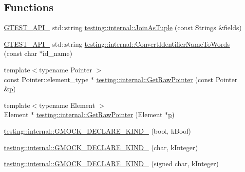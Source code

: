 \subsection*{Functions}
\begin{DoxyCompactItemize}
\item 
\mbox{\hyperlink{_obj__test_2lib_2googletest-release-1_88_81_2googletest_2include_2gtest_2internal_2gtest-port_8h_aa73be6f0ba4a7456180a94904ce17790}{G\+T\+E\+S\+T\+\_\+\+A\+P\+I\+\_\+}} std\+::string \mbox{\hyperlink{namespacetesting_1_1internal_a4ffe5309bf49f08145ed010a6d244e41}{testing\+::internal\+::\+Join\+As\+Tuple}} (const Strings \&fields)
\item 
\mbox{\hyperlink{_obj__test_2lib_2googletest-release-1_88_81_2googletest_2include_2gtest_2internal_2gtest-port_8h_aa73be6f0ba4a7456180a94904ce17790}{G\+T\+E\+S\+T\+\_\+\+A\+P\+I\+\_\+}} std\+::string \mbox{\hyperlink{namespacetesting_1_1internal_a0b375abcf3081393e6c420194a541b29}{testing\+::internal\+::\+Convert\+Identifier\+Name\+To\+Words}} (const char $\ast$id\+\_\+name)
\item 
{\footnotesize template$<$typename Pointer $>$ }\\const Pointer\+::element\+\_\+type $\ast$ \mbox{\hyperlink{namespacetesting_1_1internal_ad5e7c706ea3ebdffa1429cf3677062bd}{testing\+::internal\+::\+Get\+Raw\+Pointer}} (const Pointer \&\mbox{\hyperlink{_obj__test_2lib_2googletest-master_2googlemock_2test_2gmock-matchers__test_8cc_a6bc6b007533335efe02bafff799ec64c}{p}})
\item 
{\footnotesize template$<$typename Element $>$ }\\Element $\ast$ \mbox{\hyperlink{namespacetesting_1_1internal_ae9f6499f55e30ff23f9ed914fb8ad597}{testing\+::internal\+::\+Get\+Raw\+Pointer}} (Element $\ast$\mbox{\hyperlink{_obj__test_2lib_2googletest-master_2googlemock_2test_2gmock-matchers__test_8cc_a6bc6b007533335efe02bafff799ec64c}{p}})
\item 
\mbox{\hyperlink{namespacetesting_1_1internal_a20f5584732e44a368e7acf295b639319}{testing\+::internal\+::\+G\+M\+O\+C\+K\+\_\+\+D\+E\+C\+L\+A\+R\+E\+\_\+\+K\+I\+N\+D\+\_\+}} (bool, k\+Bool)
\item 
\mbox{\hyperlink{namespacetesting_1_1internal_ac8f3722ca21d8b14f86e5c949e843508}{testing\+::internal\+::\+G\+M\+O\+C\+K\+\_\+\+D\+E\+C\+L\+A\+R\+E\+\_\+\+K\+I\+N\+D\+\_\+}} (char, k\+Integer)
\item 
\mbox{\hyperlink{namespacetesting_1_1internal_ae5b8e77d245fd0838ab22e439e92e9af}{testing\+::internal\+::\+G\+M\+O\+C\+K\+\_\+\+D\+E\+C\+L\+A\+R\+E\+\_\+\+K\+I\+N\+D\+\_\+}} (signed char, k\+Integer)

\end{DoxyCompactItemize}
